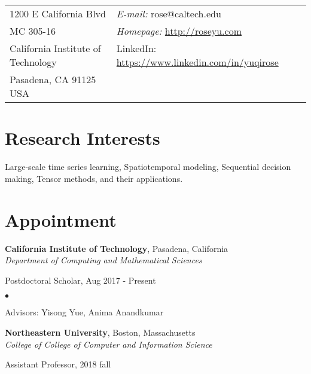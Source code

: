 \documentclass[margin,line]{res}
\newenvironment{list1}{
  \begin{list}{\ding{113}}{%
      \setlength{\itemsep}{0in}
      \setlength{\parsep}{0in} \setlength{\parskip}{0in}
      \setlength{\topsep}{0in} \setlength{\partopsep}{0in} 
      \setlength{\leftmargin}{0.17in}}}{\end{list}}
\newenvironment{list2}{
  \begin{list}{$\bullet$}{%
      \setlength{\itemsep}{0in}
      \setlength{\parsep}{0in} \setlength{\parskip}{0in}
      \setlength{\topsep}{0in} \setlength{\partopsep}{0in} 
      \setlength{\leftmargin}{0.2in}}}{\end{list}}
\begin{document}

\begin{resume}
\section{\sc }
\vspace{.05in}
\begin{tabular}{@{}p{2in}p{4in}}
1200 E California Blvd  & {\it E-mail:}  rose@caltech.edu  \\   
MC 305-16 &  {\it Homepage:} \url{http://roseyu.com} \\            
California Institute of Technology & {LinkedIn:}  \url{https://www.linkedin.com/in/yuqirose}\\
Pasadena, CA 91125 USA  & \\     
\end{tabular}


\section{\sc Research Interests}
Large-scale time series learning, Spatiotemporal modeling, Sequential decision making, Tensor methods, and their applications.

\section{\sc Appointment}
{\bf California Institute of Technology}, Pasadena, California\\
{\em Department of Computing and Mathematical Sciences} 
\begin{list1}
	\item[] Postdoctoral Scholar,  Aug 2017 - Present
	\begin{list2}
		\vspace*{.05in}
		\item Advisors:  Yisong Yue, Anima Anandkumar
	\end{list2}
	\vspace*{.05in}
\end{list1}

{\bf Northeastern University}, Boston, Massachusetts \\
{\em College of College of Computer and Information Science } 
\begin{list1}
	\item[] Assistant Professor,  2018 fall
	\vspace*{.05in}
\end{list1}




\end{resume}
\end{document}
